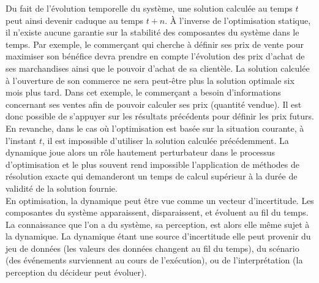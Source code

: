Du fait de l'évolution temporelle du système, une solution calculée au temps $t$ peut ainsi devenir caduque au temps $t+n$. À l'inverse de l'optimisation statique, il n'existe aucune garantie sur la stabilité des composantes du système dans le temps. Par exemple, le commerçant qui cherche à définir ses prix de vente pour maximiser son bénéfice devra prendre en compte l'évolution des prix d'achat de ses marchandises ainsi que le pouvoir d'achat de sa clientèle. La solution calculée à l'ouverture de son commerce ne sera peut-être plus la solution optimale six mois plus tard. Dans cet exemple, le commerçant a besoin d'informations concernant ses ventes afin de pouvoir calculer ses prix (quantité vendue). Il est donc possible de s'appuyer sur les résultats précédents pour définir les prix futurs. En revanche, dans le cas où l'optimisation est basée sur la situation courante, à l'instant $t$, il est impossible d'utiliser la solution calculée précédemment. La dynamique joue alors un rôle hautement perturbateur 
dans le processus d'optimisation et le plus souvent rend impossible l'application de méthodes de résolution exacte qui demanderont un temps de calcul supérieur à la durée de validité de la solution fournie.\\


En optimisation, la dynamique peut être vue comme un vecteur d'incertitude. Les composantes du système apparaissent, disparaissent, et évoluent au fil du temps. La connaissance que l'on a du système, sa perception, est alors elle même sujet à la dynamique. La dynamique étant une source d'incertitude elle peut provenir du jeu de données (les valeurs des données changent au fil du temps), du scénario (des événements surviennent au cours de l'exécution), ou de l'interprétation (la perception du décideur peut évoluer).\\

